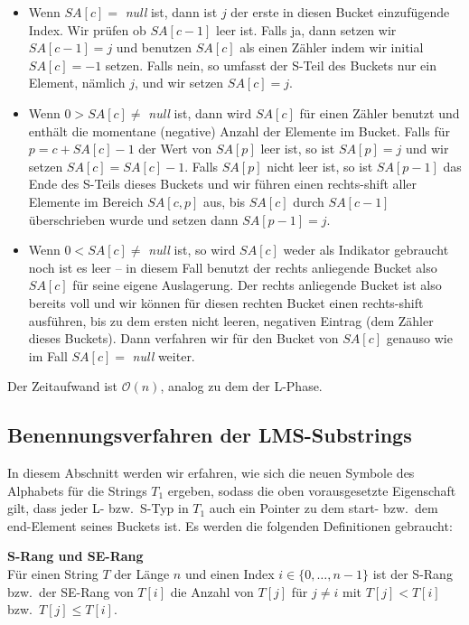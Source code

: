 \begin{itemize}
\item Wenn $SA[c] = $ \textit{null} ist, dann ist $j$ der erste in diesen Bucket einzufügende Index. Wir prüfen ob $SA[c-1]$ leer ist. Falls ja, dann setzen wir $SA[c-1] = j$ und benutzen $SA[c]$ als einen Zähler indem wir initial $SA[c] = -1$ setzen. Falls nein, so umfasst der S-Teil des Buckets nur ein Element, nämlich $j$, und wir setzen $SA[c] = j$.
\item Wenn $ 0 > SA[c] \neq$ \textit{null} ist, dann wird $SA[c]$ für einen Zähler benutzt und enthält die momentane (negative) Anzahl der Elemente im Bucket. Falls für $p = c + SA[c] - 1$ der Wert von $SA[p]$ leer ist, so ist $SA[p] = j$ und wir setzen $SA[c] = SA[c] - 1$. Falls $SA[p]$ nicht leer ist, so ist $SA[p-1]$ das Ende des S-Teils dieses Buckets und wir führen einen rechts-shift aller Elemente im Bereich $SA[c, p]$ aus, bis $SA[c]$ durch $SA[c-1]$ überschrieben wurde und setzen dann $SA[p-1] = j$.
\item Wenn $ 0 < SA[c] \neq$ \textit{null} ist, so wird $SA[c]$ weder als Indikator gebraucht noch ist es leer -- in diesem Fall benutzt der rechts anliegende Bucket also $SA[c]$ für seine eigene Auslagerung. Der rechts anliegende Bucket ist also bereits voll und wir können für diesen rechten Bucket einen rechts-shift ausführen, bis zu dem ersten nicht leeren, negativen Eintrag (dem Zähler dieses Buckets). Dann verfahren wir für den Bucket von $SA[c]$ genauso wie im Fall $SA[c] = $ \textit{null} weiter.
\end{itemize}

Der Zeitaufwand ist $\mathcal O(n)$, analog zu dem der L-Phase.

\subsection{ Benennungsverfahren der LMS-Substrings}

In diesem Abschnitt werden wir erfahren, wie sich die neuen Symbole des Alphabets für die Strings $T_1$ ergeben, sodass die oben vorausgesetzte Eigenschaft gilt, dass jeder L- bzw.\ S-Typ in $T_1$ auch ein Pointer zu dem start- bzw.\ dem end-Element seines Buckets ist. Es werden die folgenden Definitionen gebraucht:

\begin{definition}\textbf{S-Rang und SE-Rang}\\
Für einen String $T$ der Länge $n$ und einen Index $i \in \{0, \ldots, n-1\}$ ist der S-Rang bzw.\ der SE-Rang von $T[i]$ die Anzahl von $T[j]$ für $j \neq i$ mit $T[j] < T[i]$ bzw.\ $T[j] \leq T[i]$. 
\end{definition}

